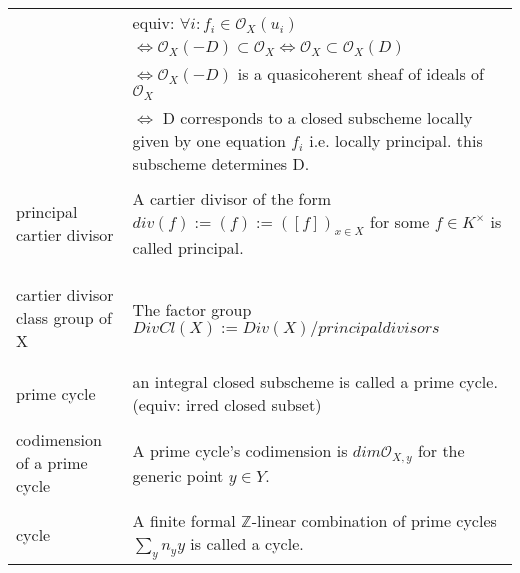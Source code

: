 \documentclass[a4paper, 12pt]{article}
\newcommand{\ca}[1]{\mathcal{#1}}
\newcommand{\ox}{\mathcal{O}_X}
\begin{document}
\begin{longtable}{p{}  p{} }
  & equiv: $\forall i :  f_i \in \ox(u_i)$\\
  &$\iff \ox(-D) \subset \ox \iff \ox \subset \ox(D)$\\
  &$\iff \ox(-D)$ is a quasicoherent sheaf of ideals of $ \ox$ \\
  & $\iff $ D corresponds to a closed subscheme locally given by  one equation $f_i$ i.e. locally principal. this subscheme determines D. \\

  \\

  principal cartier divisor & A cartier divisor of the form $div(f) := (f) := ([f])_{x \in X}$ for some $f \in K^{\times}$ is called principal.\\

  \\



\\
\newline
\\




  cartier divisor class group of X & The factor group $DivCl(X) := Div(X)/{principal divisors}$\\

  &\\

\\




    prime cycle & an integral closed subscheme is called a prime cycle. (equiv: irred closed subset)\\

    &\\

    codimension of a prime cycle & A prime cycle's codimension is $dim \ca{O}_{X,y}$ for the generic point $y \in Y$.\\

    &\\

    cycle & A finite formal $\mathbb{Z}$-linear combination of prime cycles $\sum_y n_y y$ is called a cycle.\\


\end{longtable}
\end{document}

